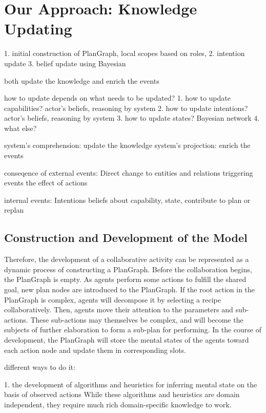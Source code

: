 \graphicspath{{Figures/}}

\chapter{Our Approach: Knowledge Updating} %
\label{cha:knowledge_updating}
1. initial construction of PlanGraph, local scopes based on roles, 
2. intention update
3. belief update using Bayesian

both update the knowledge and enrich the events


how to update depends on what needs to be updated?
1. how to update capabilities? actor's beliefs, reasoning by system
2. how to update intentions? actor's beliefs, reasoning by system
3. how to update states? Bayesian network
4. what else?

system's comprehension: update the knowledge
system's projection: enrich the events


conseqence of external events:
Direct change to entities and relations
triggering events
the effect of actions

internal events:
Intentions
beliefs about capability, state, 
contribute to plan or replan


\section{Construction and Development of the Model} %
\label{sec:construction_and_development_of_the_model}
Therefore, the development of a collaborative activity can be represented as a dynamic process of constructing a PlanGraph. Before the collaboration begins, the PlanGraph is empty. As agents perform some actions to fulfill the shared goal, new plan nodes are introduced to the PlanGraph. If the root action in the PlanGraph is complex, agents will decompose it by selecting a recipe collaboratively. Then, agents move their attention to the parameters and sub-actions. These sub-actions may themselves be complex, and will become the subjects of further elaboration to form a sub-plan for performing. In the course of development, the PlanGraph will store the mental states of the agents toward each action node and update them in corresponding slots. 



different ways to do it:

1. the development of algorithms and heuristics for inferring mental state on the basis of observed actions While these algorithms and heuristics are domain independent, they require much rich domain-specific knowledge to work.


